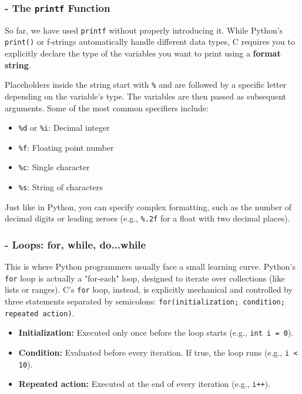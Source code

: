 

\subsubsection{- The \texttt{printf} Function}

So far, we have used \texttt{printf} without properly introducing it. While Python's \texttt{print()} or f-strings automatically handle different data types, C requires you to explicitly declare the type of the variables you want to print using a \textbf{format string}.

Placeholders inside the string start with \texttt{\%} and are followed by a specific letter depending on the variable's type. The variables are then passed as subsequent arguments. Some of the most common specifiers include:
\begin{itemize}
    \item[-] \texttt{\%d} or \texttt{\%i}: Decimal integer
    \item[-] \texttt{\%f}: Floating point number
    \item[-] \texttt{\%c}: Single character
    \item[-] \texttt{\%s}: String of characters
\end{itemize}

Just like in Python, you can specify complex formatting, such as the number of decimal digits or leading zeroes (e.g., \texttt{\%.2f} for a float with two decimal places).



\subsubsection{- Loops: for, while, do...while}

This is where Python programmers usually face a small learning curve. Python's \texttt{for} loop is actually a "for-each" loop, designed to iterate over collections (like lists or ranges). C's \texttt{for} loop, instead, is explicitly mechanical and controlled by three statements separated by semicolons: \texttt{for(initialization; condition; repeated action)}.
\begin{itemize}
    \item[-] \textbf{Initialization:} Executed only once before the loop starts (e.g., \texttt{int i = 0}).
    \item[-] \textbf{Condition:} Evaluated before every iteration. If true, the loop runs (e.g., \texttt{i < 10}).
    \item[-] \textbf{Repeated action:} Executed at the end of every iteration (e.g., \texttt{i++}).
\end{itemize}

